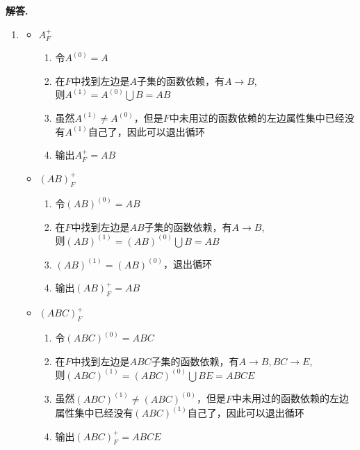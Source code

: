 \documentclass[12pt, oneside]{ctexart}
\numberwithin{figure}{section}
\numberwithin{table}{section}
\newenvironment{solution}{\par\noindent\textbf{解答. }}{\par}
\begin{document}
\begin{solution}
    \begin{enumerate}[(1)]
        \item 
            \begin{itemize}
                \item $A_F^+$
                \begin{enumerate}[$1^\circ$]
                    \item 令$A^{(0)} = A$
                    \item 在$F$中找到左边是$A$子集的函数依赖，有$A \rightarrow B$, \\
                    则$A^{(1)} = A^{(0)}\bigcup B = AB$
                    \item 虽然$A^{(1)} \not= A^{(0)}$，但是$F$中未用过的函数依赖的左边属性集中已经没有$A^{(1)}$自己了，因此可以退出循环
                    \item 输出$A_F^+ = AB$
                \end{enumerate}
                \item $(AB)_F^+$
                \begin{enumerate}[$1^\circ$]
                    \item 令$(AB)^{(0)} = AB$
                    \item 在$F$中找到左边是$AB$子集的函数依赖，有$A \rightarrow B$, \\
                    则$(AB)^{(1)} = (AB)^{(0)}\bigcup B = AB$
                    \item $(AB)^{(1)} = (AB)^{(0)}$，退出循环
                    \item 输出$(AB)_F^+ = AB$
                \end{enumerate}
                \item $(ABC)_F^+$
                \begin{enumerate}[$1^\circ$]
                    \item 令$(ABC)^{(0)} = ABC$
                    \item 在$F$中找到左边是$ABC$子集的函数依赖，有$A \rightarrow B, BC \rightarrow E$, \\
                    则$(ABC)^{(1)} = (ABC)^{(0)}\bigcup BE = ABCE$
                    \item 虽然$(ABC)^{(1)} \not= (ABC)^{(0)}$，但是$F$中未用过的函数依赖的左边属性集中已经没有$(ABC)^{(1)}$自己了，因此可以退出循环
                    \item 输出$(ABC)_F^+ = ABCE$
                \end{enumerate}

\end{itemize}
\end{enumerate}
\end{solution}
\end{document}
